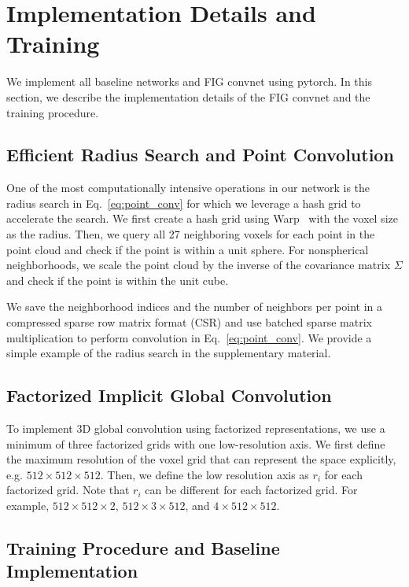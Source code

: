 
\section{Implementation Details and Training}

We implement all baseline networks and FIG convnet using pytorch. In this section, we describe the implementation details of the FIG convnet and the training procedure.

\subsection{Efficient Radius Search and Point Convolution}
\label{sec:radius_search}

One of the most computationally intensive operations in our network is the radius search in Eq.~\ref{eq:point_conv} for which we leverage a hash grid to accelerate the search. We first create a hash grid using Warp~\citep{warp2022} with the voxel size as the radius. Then, we query all 27 neighboring voxels for each point in the point cloud and check if the point is within a unit sphere. For nonspherical neighborhoods, we scale the point cloud by the inverse of the covariance matrix $\Sigma$ and check if the point is within the unit cube.

We save the neighborhood indices and the number of neighbors per point in a compressed sparse row matrix format (CSR) and use batched sparse matrix multiplication to perform convolution in Eq.~\ref{eq:point_conv}. We provide a simple example of the radius search in the supplementary material.

\subsection{Factorized Implicit Global Convolution}
\label{sec:fig_conv_impl}

To implement 3D global convolution using factorized representations, we use a minimum of three factorized grids with one low-resolution axis. We first define the maximum resolution of the voxel grid that can represent the space explicitly, e.g. $512\times 512\times 512$. Then, we define the low resolution axis as $r_i$ for each factorized grid. Note that $r_i$ can be different for each factorized grid. For example, $512\times 512\times 2$, $512\times 3\times 512$, and $4\times 512\times 512$.

\subsection{Training Procedure and Baseline Implementation}


